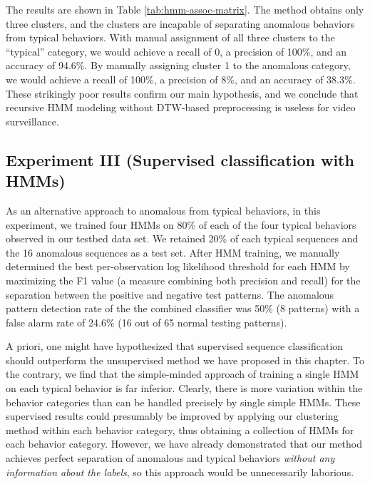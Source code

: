 The results are shown in Table \ref{tab:hmm-assoc-matrix}. The method
obtains only three clusters, and the clusters are incapable of
separating anomalous behaviors from typical behaviors.  With manual
assignment of all three clusters to the ``typical'' category, we would
achieve a recall of 0, a precision of 100\%, and an accuracy of
94.6\%.  By manually assigning cluster 1 to the anomalous category, we
would achieve a recall of 100\%, a precision of 8\%, and an accuracy
of 38.3\%.  These strikingly poor results confirm our main hypothesis,
and we conclude that recursive HMM modeling without DTW-based
preprocessing is useless for video surveillance.

\subsection{Experiment III (Supervised classification with HMMs)} 

As an alternative approach to \DIFdelbegin {}\DIFdelend \DIFaddbegin {}\DIFaddend anomalous from typical
behaviors, in this experiment, we trained four HMMs on 80\% of each of
the four typical behaviors observed in our testbed data set.  We
retained 20\% of each typical sequences and the 16 anomalous sequences
as a test set. After HMM training, we manually determined the best
per-observation log likelihood threshold for each HMM by maximizing
the F1 value (a measure combining both precision and recall) for the
separation between the positive and negative test patterns.  The
anomalous pattern detection rate of the the combined classifier was
50\% (8 patterns) with a false alarm rate of 24.6\% (16 out of 65
normal testing patterns).

A priori, one might have hypothesized that supervised sequence
classification should outperform the unsupervised method we have
proposed in this chapter.  To the contrary, we find that the
simple-minded approach of training a single HMM on each typical
behavior is far inferior.  Clearly, there is more variation within the
behavior categories than can be handled precisely by single simple
HMMs.  These supervised results could presumably be improved by
applying our clustering method within each behavior category, thus
obtaining a collection of HMMs for each behavior category.  However,
we have already demonstrated that our method achieves perfect
separation of anomalous and typical behaviors \textit{without any
information about the labels}, so this approach would be unnecessarily
laborious.

